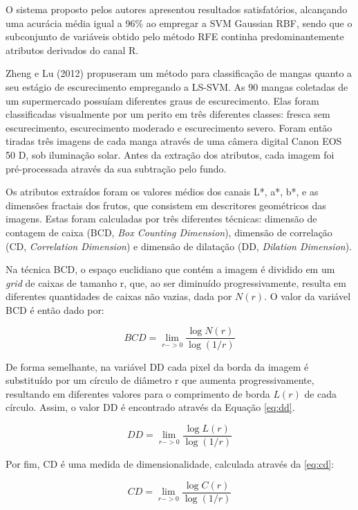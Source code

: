 O sistema proposto pelos autores apresentou resultados satisfatórios, alcançando uma acurácia média igual a 96\% ao empregar a SVM Gaussian RBF, sendo que o subconjunto de variáveis obtido pelo método RFE continha predominantemente atributos derivados do canal R.

Zheng e Lu (2012) propuseram um método para classificação de mangas quanto a seu estágio de escurecimento empregando a LS-SVM. As 90 mangas coletadas de um supermercado possuíam diferentes graus de escurecimento. Elas foram classificadas visualmente por um perito em três diferentes classes: fresca sem escurecimento, escurecimento moderado e escurecimento severo. Foram então tiradas três imagens de cada manga através de uma câmera digital Canon EOS 50 D, sob iluminação solar. Antes da extração dos atributos, cada imagem foi pré-processada através da sua subtração pelo fundo.

Os atributos extraídos foram os valores médios dos canais L*, a*, b*, e as dimensões fractais dos frutos, que consistem em descritores geométricos das imagens. Estas foram calculadas por três diferentes técnicas: dimensão de contagem de caixa (BCD, \textit{Box Counting Dimension}), dimensão de correlação (CD, \textit{Correlation Dimension}) e dimensão de dilatação (DD, \textit{Dilation Dimension}). 

Na técnica BCD, o espaço euclidiano que contém a imagem é dividido em um \textit{grid} de caixas de tamanho r, que, ao ser diminuído progressivamente, resulta em diferentes quantidades de caixas não vazias, dada por $N(r)$. O valor da variável BCD é então dado por:

\begin{equation} \label{eq:bcd}
	BCD = \lim_{r->0}\frac{\log{N(r)}}{\log{(1/r)}}
\end{equation}

De forma semelhante, na variável DD cada pixel da borda da imagem é substituído por um círculo de diâmetro r que aumenta progressivamente, resultando em diferentes valores para o comprimento de borda $L(r)$ de cada círculo. Assim, o valor DD é encontrado através da Equação \ref{eq:dd}.

\begin{equation} \label{eq:dd}
	DD = \lim_{r->0}{\frac{\log{L(r)}}{\log{(1/r)}}}
\end{equation}

Por fim, CD é uma medida de dimensionalidade, calculada através da \ref{eq:cd}:

\begin{equation} \label{eq:cd}
	CD = \lim_{r->0}{\frac{\log{C(r)}}{\log{(1/r)}}}
\end{equation}


